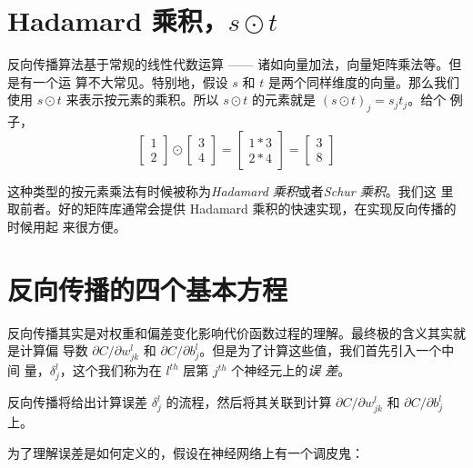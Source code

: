 \section{Hadamard 乘积，$s \odot t$}
\label{sec:the_hadamard_product}

反向传播算法基于常规的线性代数运算 —— 诸如向量加法，向量矩阵乘法等。但是有一个运
算不大常见。特别地，假设 $s$ 和 $t$ 是两个同样维度的向量。那么我们使用 $s\odot
t$ 来表示按元素的乘积。所以 $s\odot t$ 的元素就是 $(s\odot t)_j = s_j t_j$。给个
例子，
\begin{equation}
  \left[\begin{array}{c} 1 \\ 2 \end{array}\right] 
  \odot \left[\begin{array}{c} 3 \\ 4\end{array} \right]
  = \left[ \begin{array}{c} 1 * 3 \\ 2 * 4 \end{array} \right]
  = \left[ \begin{array}{c} 3 \\ 8 \end{array} \right]
  \label{eq:28}\tag{28}
\end{equation}

这种类型的按元素乘法有时候被称为\emph{Hadamard 乘积}或者\emph{Schur 乘积}。我们这
里取前者。好的矩阵库通常会提供 Hadamard 乘积的快速实现，在实现反向传播的时候用起
来很方便。

\section{反向传播的四个基本方程}
\label{sec:the_four_fundamental_equations_behind_backpropagation}

反向传播其实是对权重和偏差变化影响代价函数过程的理解。最终极的含义其实就是计算偏
导数 $\partial C/\partial w_{jk}^l$ 和
$\partial C/\partial b_j^l$。但是为了计算这些值，我们首先引入一个中间
量，$\delta_j^l$，这个我们称为在 $l^{th}$ 层第 $j^{th}$ 个神经元上的\emph{误
  差}。

反向传播将给出计算误差 $\delta_j^l$ 的流程，然后将其关联到计算 $\partial
C/\partial w_{jk}^l$ 和 $\partial C/\partial b_j^l$ 上。

为了理解误差是如何定义的，假设在神经网络上有一个调皮鬼：

